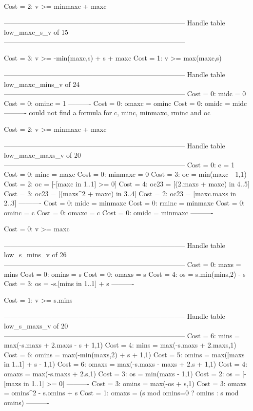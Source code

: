 Cost =  2:  v >= minmaxc + maxc

--------------------------------------------------------------------------------
Handle table low_maxc_s_v of 15
--------------------------------------------------------------------------------

Cost =  3:  v >= -min(maxc,s) + s + maxc
Cost =  1:  v >= max(maxc,s)

--------------------------------------------------------------------------------
Handle table low_maxc_mins_v of 24
--------------------------------------------------------------------------------
Cost =  0:  midc    = 0
Cost =  0:  ominc   = 1
----------
Cost =  0:  omaxc   = ominc
Cost =  0:  omidc   = midc
----------
could not find a formula for c, minc, minmaxc, rminc and oc

Cost =  2:  v >= minmaxc + maxc

--------------------------------------------------------------------------------
Handle table low_maxc_maxs_v of 20
--------------------------------------------------------------------------------
Cost =  0:  c       = 1
Cost =  0:  minc    = maxc
Cost =  0:  minmaxc = 0
Cost =  3:  oc      = min(maxc - 1,1)
Cost =  2:  oc      = [-[maxc in 1..1] >= 0]
Cost =  4:  oc23    = [(2.maxs + maxc) in 4..5]
Cost =  3:  oc23    = [(maxs^2 + maxc) in 3..4]
Cost =  2:  oc23    = [maxc.maxs in 2..3]
----------
Cost =  0:  midc    = minmaxc
Cost =  0:  rminc   = minmaxc
Cost =  0:  ominc   = c
Cost =  0:  omaxc   = c
Cost =  0:  omidc   = minmaxc
----------

Cost =  0:  v >= maxc

--------------------------------------------------------------------------------
Handle table low_s_mins_v of 26
--------------------------------------------------------------------------------
Cost =  0:  maxs  = mins
Cost =  0:  omins = s
Cost =  0:  omaxs = s
Cost =  4:  os    = s.min(mins,2) - s
Cost =  3:  os    = -s.[mins in 1..1] + s
----------

Cost =  1:  v >= s.mins

--------------------------------------------------------------------------------
Handle table low_s_maxs_v of 20
--------------------------------------------------------------------------------
Cost =  6:  mins  = max(-s.maxs + 2.maxs - s + 1,1)
Cost =  4:  mins  = max(-s.maxs + 2.maxs,1)
Cost =  6:  omins = max(-min(maxs,2) + s + 1,1)
Cost =  5:  omins = max([maxs in 1..1] + s - 1,1)
Cost =  6:  omaxs = max(-s.maxs - maxs + 2.s + 1,1)
Cost =  4:  omaxs = max(-s.maxs + 2.s,1)
Cost =  3:  os    = min(maxs - 1,1)
Cost =  2:  os    = [-[maxs in 1..1] >= 0]
----------
Cost =  3:  omins = max(-os + s,1)
Cost =  3:  omaxs = omins^2 - s.omins + s
Cost =  1:  omaxs = (s mod omins=0 ? omins : s mod omins)
----------

